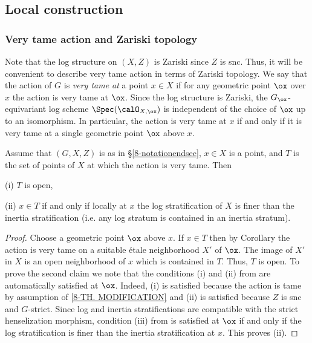 \documentclass[10pt]{../fichiers-configuration-latex/smfart}
\begin{document}
\subsection{Local construction}\label{8-localsec}

\subsubsection{Very tame action and Zariski
topology}\label{8-verytamesec} Note that the log structure on
$(X,Z)$ is Zariski since $Z$ is snc. Thus, it will be convenient
to describe very tame action in terms of Zariski topology. We say
that the action of $G$ is {\em very tame at} a point $x\in X$ if
for any geometric point $\ox$ over $x$ the action is very tame at
$\ox$. Since the log structure is Zariski, the $G_\ox$-equivariant
log scheme $\Spec(\calO_{X,\ox})$ is independent of the choice of
$\ox$ up to an isomorphism. In particular, the action is very tame
at $x$ if and only if it is very tame at a single geometric point
$\ox$ above $x$.

\begin{lemma2}\label{8-tamelocallem} Assume that $(G,X,Z)$ is as
in \S\ref{8-notationendsec}, $x\in X$ is a point, and $T$ is the
set of points of $X$ at which the action is very tame. Then

(i) $T$ is open,

(ii) $x\in T$ if and only if locally at $x$ the log stratification of
$X$ is finer than the inertia stratification (i.e. any log stratum
is contained in an inertia stratum).  \end{lemma2} \begin{proof}
Choose a geometric point $\ox$ above $x$. If $x\in T$ then by
Corollary  the action is very tame on a suitable \'etale
neighborhood $X'$ of $\ox$. The image of $X'$ in $X$ is an open
neighborhood of $x$ which is contained in $T$. Thus, $T$ is open. To
prove the second claim we note that the conditions (i) and (ii) from
 are automatically satisfied at $\ox$. Indeed, (i) is satisfied
because the action is tame by assumption of \ref{8-TH. MODIFICATION}
and (ii) is satisfied because $Z$ is snc and $G$-strict. Since
log and inertia stratifications are compatible with the strict
henselization morphism, condition (iii) from  is satisfied
at $\ox$ if and only if the log stratification is finer than the
inertia stratification at $x$. This proves (ii).  \end{proof}
\end{document}
